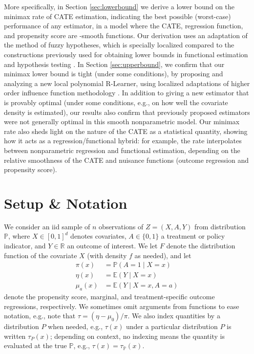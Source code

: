 \documentclass[11pt,twoside]{article}
\newcommand{\Pb}{\mathbb{P}}
\newcommand{\E}{\mathbb{E}}
\newcommand{\R}{\mathbb{R}}
\newcommand{\Holder}{\text{H\"{o}lder}}
\theoremstyle{definition}
\theoremstyle{remark}
\begin{document}
More specifically, in Section \ref{sec:lowerbound}  we derive a lower bound on the minimax rate of CATE estimation, indicating the best possible (worst-case) performance of any estimator, in a model where the CATE, regression function, and propensity score are \Holder{}-smooth functions.  Our derivation uses an adaptation of the method of fuzzy hypotheses, which is specially localized compared to the constructions previously used for obtaining lower bounds in functional estimation and hypothesis testing \citep{ibragimov1987some, birge1995estimation, nemirovski2000topics, ingster2003nonparametric, tsybakov2009introduction, robins2009semiparametric}. In Section \ref{sec:upperbound}, we confirm that our minimax lower bound is tight (under some conditions), by proposing and analyzing a new local polynomial R-Learner, using localized adaptations of higher order influence function methodology \citep{robins2008higher, robins2009quadratic, robins2017minimax}. In addition to giving a new estimator that is provably optimal (under some conditions, e.g., on how well the covariate density is estimated), our results also confirm that previously proposed estimators were not generally optimal in this smooth nonparametric model. Our minimax rate also sheds light on the nature of the CATE as a statistical quantity, showing how it acts as a regression/functional hybrid: for example, the rate interpolates between nonparametric regression and functional estimation, depending on the relative smoothness of the CATE and nuisance functions (outcome regression and propensity score). \\

\section{Setup \& Notation}

We consider an iid sample of $n$ observations of $Z=(X,A,Y)$ from distribution $\Pb$, where $X \in [0,1]^d$ denotes covariates, $A \in \{0,1\}$  a treatment or policy indicator, and $Y \in \R$ an outcome of interest. We let $F$ denote the distribution function of the covariate $X$ (with density $f$ as needed), and let 
\begin{align*}
\pi(x) &= \Pb(A=1 \mid X=x) \\
\eta(x) &= \E(Y \mid X=x) \\
\mu_a(x) &= \E(Y \mid X=x, A=a)
\end{align*}
denote the propensity score, marginal, and treatment-specific outcome regressions, respectively. We sometimes omit arguments from functions to ease notation, e.g., note that $\tau=(\eta-\mu_0)/\pi$. We also index quantities by a distribution $P$ when needed, e.g., $\tau(x)$ under a particular distribution $P$ is written $\tau_P(x)$; depending on context, no indexing means the quantity is evaluated at the true $\Pb$, e.g., $\tau(x)=\tau_\Pb(x)$.  \\
\end{document}
